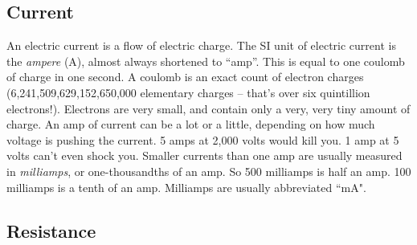 \bigskip



\subsection*{Current}

An electric current is a flow of electric charge. The SI unit of electric current is the \emph{ampere} (A), almost always shortened to ``amp''. This is equal to one coulomb of charge in one second. A coulomb is an exact count of electron charges (6,241,509,629,152,650,000 elementary charges -- that's over six quintillion electrons!). Electrons are very small, and contain only a very, very tiny amount of charge. An amp of current can be a lot or a little, depending on how much voltage is pushing the current. 5 amps at 2,000 volts would kill you. 1 amp at 5 volts can't even shock you. Smaller currents than one amp are usually measured in \emph{milliamps}, or one-thousandths of an amp. So 500 milliamps is half an amp. 100 milliamps is a tenth of an amp. Milliamps are usually abbreviated ``mA".

\bigskip




\subsection*{Resistance}

